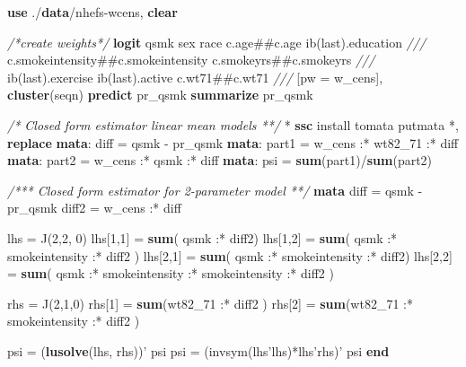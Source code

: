 \documentclass[
  10pt,
]{book}
\newenvironment{Shaded}{\begin{snugshade}}{\end{snugshade}}
\newcommand{\CommentTok}[1]{\textcolor[rgb]{0.56,0.35,0.01}{\textit{#1}}}
\newcommand{\FunctionTok}[1]{\textcolor[rgb]{0.00,0.00,0.00}{#1}}
\newcommand{\KeywordTok}[1]{\textcolor[rgb]{0.13,0.29,0.53}{\textbf{#1}}}
\newcommand{\NormalTok}[1]{#1}
\begin{document}
\begin{Shaded}
\begin{Highlighting}[]
\KeywordTok{use}\NormalTok{ ./}\KeywordTok{data}\NormalTok{/nhefs-wcens, }\KeywordTok{clear}

\CommentTok{/*create weights*/}
\KeywordTok{logit}\NormalTok{ qsmk sex race c.age##c.age ib(}\FunctionTok{last}\NormalTok{).education }\CommentTok{///}
\NormalTok{  c.smokeintensity##c.smokeintensity c.smokeyrs##c.smokeyrs }\CommentTok{///}
\NormalTok{  ib(}\FunctionTok{last}\NormalTok{).exercise ib(}\FunctionTok{last}\NormalTok{).active c.wt71##c.wt71 }\CommentTok{///}
\NormalTok{  [pw = w_cens], }\KeywordTok{cluster}\NormalTok{(seqn)}
\KeywordTok{predict}\NormalTok{ pr_qsmk}
\KeywordTok{summarize}\NormalTok{ pr_qsmk}

\CommentTok{/* Closed form estimator linear mean models  **/}
\NormalTok{* }\KeywordTok{ssc}\NormalTok{ install tomata}
\NormalTok{putmata *, }\KeywordTok{replace}
\KeywordTok{mata}\NormalTok{: }\FunctionTok{diff}\NormalTok{ = qsmk - pr_qsmk}
\KeywordTok{mata}\NormalTok{: part1 = w_cens :* wt82_71 :* }\FunctionTok{diff}
\KeywordTok{mata}\NormalTok{: part2 = w_cens :* qsmk :* }\FunctionTok{diff}
\KeywordTok{mata}\NormalTok{: psi = }\KeywordTok{sum}\NormalTok{(part1)/}\KeywordTok{sum}\NormalTok{(part2)}

\CommentTok{/*** Closed form estimator for 2-parameter model **/}
\KeywordTok{mata}
\FunctionTok{diff}\NormalTok{ = qsmk - pr_qsmk}
\NormalTok{diff2 = w_cens :* }\FunctionTok{diff}

\NormalTok{lhs = }\FunctionTok{J}\NormalTok{(2,2, 0)}
\NormalTok{lhs[1,1] = }\KeywordTok{sum}\NormalTok{( qsmk :* diff2)}
\NormalTok{lhs[1,2] = }\KeywordTok{sum}\NormalTok{( qsmk :* smokeintensity :* diff2 )}
\NormalTok{lhs[2,1] = }\KeywordTok{sum}\NormalTok{( qsmk :* smokeintensity :* diff2)}
\NormalTok{lhs[2,2] = }\KeywordTok{sum}\NormalTok{( qsmk :* smokeintensity :* smokeintensity :* diff2 )}
                                                                
\NormalTok{rhs = }\FunctionTok{J}\NormalTok{(2,1,0)}
\NormalTok{rhs[1] = }\KeywordTok{sum}\NormalTok{(wt82_71 :* diff2 )}
\NormalTok{rhs[2] = }\KeywordTok{sum}\NormalTok{(wt82_71 :* smokeintensity :* diff2 )}

\NormalTok{psi = (}\KeywordTok{lusolve}\NormalTok{(lhs, rhs))'}
\NormalTok{psi}
\NormalTok{psi = (}\FunctionTok{invsym}\NormalTok{(lhs'lhs)*lhs'rhs)'}
\NormalTok{psi}
\KeywordTok{end}
\end{Highlighting}
\end{Shaded}
\end{document}
